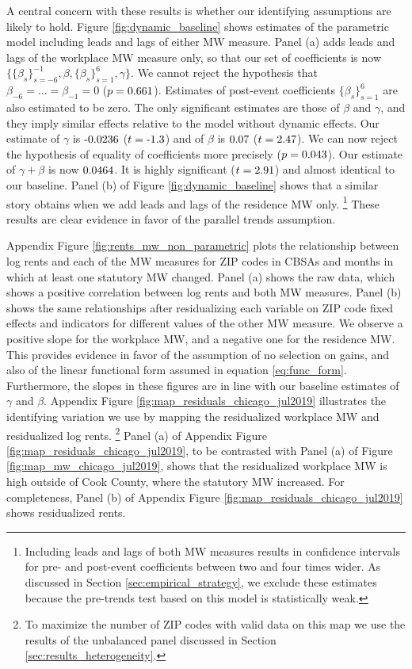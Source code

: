 A central concern with these results is whether our identifying assumptions are 
likely to hold.
Figure \ref{fig:dynamic_baseline} shows estimates of the parametric model 
including leads and lags of either MW measure.
Panel (a) adds leads and lags of the workplace MW measure only, so that
our set of coefficients is now 
$\{\{\beta_s\}_{s=-6}^{-1},\beta,\{\beta_s\}_{s=1}^6,\gamma\}$.
We cannot reject the hypothesis that $\beta_{-6}=...=\beta_{-1}=0$ 
($p = \textnormal{0.661}$).
Estimates of post-event coefficients $\{\beta_s\}_{s=1}^6$ are also estimated to 
be zero.
The only significant estimates are those of $\beta$ and $\gamma$, and they imply
similar effects relative to the model without dynamic effects.
Our estimate of $\gamma$ is $\textnormal{-0.0236}$ 
($t=\textnormal{-1.3}$) and of $\beta$ is $\textnormal{0.07}$ 
($t=\textnormal{2.47}$).
We can now reject the hypothesis of equality of coefficients more precisely 
($p = \textnormal{0.043}$).
Our estimate of $\gamma+\beta$ is now $\textnormal{0.0464}$.
It is highly significant ($t=\textnormal{2.91}$) and almost identical to 
our baseline.
Panel (b) of Figure \ref{fig:dynamic_baseline} shows that a similar story 
obtains when we add leads and lags of the residence MW only.%
\footnote{Including leads and lags of both MW measures results in confidence 
intervals for pre- and post-event coefficients between two and four times wider.
As discussed in Section \ref{sec:empirical_strategy}, we exclude these estimates 
because the pre-trends test based on this model is statistically weak.}
These results are clear evidence in favor of the parallel trends assumption.

Appendix Figure \ref{fig:rents_mw_non_parametric} plots the relationship 
between log rents and each of the MW measures for ZIP codes in CBSAs and 
months in which at least one statutory MW changed.
Panel (a) shows the raw data, which shows a positive correlation between log rents
and both MW measures.
Panel (b) shows the same relationships after residualizing each variable on 
ZIP code fixed effects and indicators for different values of the other MW 
measure.
We observe a positive slope for the workplace MW, and a negative one for
the residence MW.
This provides evidence in favor of the assumption of no selection on gains, and
also of the linear functional form assumed in equation \eqref{eq:func_form}. 
Furthermore, the slopes in these figures are in line with our baseline estimates
of $\gamma$ and $\beta$.
Appendix Figure \ref{fig:map_residuals_chicago_jul2019} illustrates the 
identifying variation we use by mapping the residualized workplace MW and 
residualized log rents.%
\footnote{To maximize the number of ZIP codes with valid data on this map we
use the results of the unbalanced panel discussed in Section 
\ref{sec:results_heterogeneity}.}
Panel (a) of Appendix Figure \ref{fig:map_residuals_chicago_jul2019}, to be 
contrasted with Panel (a) of Figure \ref{fig:map_mw_chicago_jul2019}, 
shows that the residualized workplace MW is high outside of Cook County, where
the statutory MW increased.
For completeness, Panel (b) of Appendix Figure 
\ref{fig:map_residuals_chicago_jul2019} shows residualized rents.

